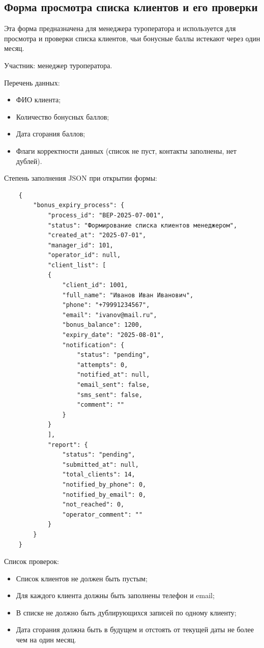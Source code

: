 \documentclass[11pt,a4paper,final]{article}
\begin{document}
\subsection{Форма просмотра списка клиентов и его проверки}

Эта форма предназначена для менеджера туроператора и используется для просмотра
и проверки списка клиентов, чьи бонусные баллы истекают через один месяц.

Участник: менеджер туроператора.

Перечень данных:
\begin{itemize}
	\item ФИО клиента;
	\item Количество бонусных баллов;
	\item Дата сгорания баллов;
	\item Флаги корректности данных (список не пуст, контакты заполнены, нет дублей).
\end{itemize}

Степень заполнения JSON при открытии формы:
\begin{verbatim}
	{
		"bonus_expiry_process": {
			"process_id": "BEP-2025-07-001",
			"status": "Формирование списка клиентов менеджером",
			"created_at": "2025-07-01",
			"manager_id": 101,
			"operator_id": null,
			"client_list": [
			{
				"client_id": 1001,
				"full_name": "Иванов Иван Иванович",
				"phone": "+79991234567",
				"email": "ivanov@mail.ru",
				"bonus_balance": 1200,
				"expiry_date": "2025-08-01",
				"notification": {
					"status": "pending",
					"attempts": 0,
					"notified_at": null,
					"email_sent": false,
					"sms_sent": false,
					"comment": ""
				}
			}
			],
			"report": {
				"status": "pending",
				"submitted_at": null,
				"total_clients": 14,
				"notified_by_phone": 0,
				"notified_by_email": 0,
				"not_reached": 0,
				"operator_comment": ""
			}
		}
	}
\end{verbatim}

Список проверок:
\begin{itemize}
	\item Список клиентов не должен быть пустым;
	\item Для каждого клиента должны быть заполнены телефон и email;
	\item В списке не должно быть дублирующихся записей по одному клиенту;
	\item Дата сгорания должна быть в будущем и отстоять от текущей даты
	не более чем на один месяц.
\end{itemize}
\end{document}
